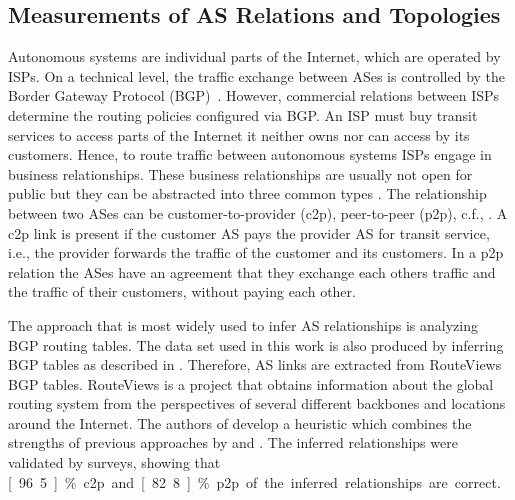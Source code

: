 \subsection{Measurements of AS Relations and Topologies}

Autonomous systems are individual parts of the Internet, which are operated by ISPs.
On a technical level, the traffic exchange between ASes is controlled by the Border Gateway Protocol (BGP)~\cite{trangia2009}. However, commercial relations between ISPs determine the routing policies configured via BGP.
An ISP must buy transit services to access parts of the Internet it neither owns nor can access by its customers.
Hence, to route traffic between autonomous systems ISPs engage in business relationships.
These business relationships are usually not open for public but they can be abstracted into three common types \cite{gao2001}.
The relationship between two ASes can be customer-to-provider (c2p), peer-to-peer (p2p), c.f., .
A c2p link is present if the customer AS pays the provider AS for transit service, i.e., the provider forwards the traffic of the customer and its customers. In a p2p relation the ASes have an agreement that they exchange each others traffic and the traffic of their customers, without paying each other. %

The approach that is most widely used to infer AS relationships is analyzing BGP routing tables. The data set used in this work is also produced by inferring BGP tables as described in \cite{dimitropoulos2007relationships}.
Therefore, AS links are extracted from RouteViews BGP tables.
RouteViews is a project that obtains information about the global routing system from the perspectives of several different backbones and locations around the Internet.
The authors of \cite{dimitropoulos2007relationships} develop a heuristic which combines the strengths of previous approaches by \cite{gao2001} and \cite{di2003computing}. The inferred relationships were validated by surveys, showing that \unit[96.5]{\%} c2p and \unit[82.8]{\%} p2p of the inferred relationships are correct.

